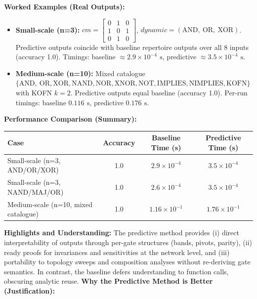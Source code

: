 \textbf{Worked Examples (Real Outputs):}
\begin{itemize}
 \item \textbf{Small-scale (n=3):} \(cm=\begin{bmatrix}0&1&0\\1&0&1\\0&1&0\end{bmatrix}\), \(dynamic=(\mathrm{AND},\ \mathrm{OR},\ \mathrm{XOR})\). Predictive outputs coincide with baseline repertoire outputs over all 8 inputs (accuracy 1.0). Timings: baseline \(\approx 2.9\times 10^{-4}\,\ \mathrm{s}\), predictive \(\approx 3.5\times 10^{-4}\,\ \mathrm{s}\).
 \item \textbf{Medium-scale (n=10):} Mixed catalogue \(\{\mathrm{AND},\ \mathrm{OR}, \mathrm{XOR}, \mathrm{NAND}, \mathrm{NOR}, \mathrm{XNOR}, \mathrm{NOT}, \mathrm{IMPLIES}, \mathrm{NIMPLIES}, \mathrm{KOFN}\}\) with KOFN \(k=2\). Predictive outputs equal baseline (accuracy 1.0). Per-run timings: baseline \(0.116\,\ \mathrm{s}\), predictive \(0.176\,\ \mathrm{s}\).
\end{itemize}
\textbf{Performance Comparison (Summary):}
\begin{center}
\begin{tabular}{lccc}
\toprule
\textbf{Case} & \textbf{Accuracy} & \textbf{Baseline Time (s)} & \textbf{Predictive Time (s)} \\
\midrule
Small-scale (n=3, AND/OR/XOR) & 1.0 & $2.9\times 10^{-4}$ & $3.5\times 10^{-4}$ \\
Small-scale (n=3, NAND/MAJ/OR) & 1.0 & $2.6\times 10^{-4}$ & $3.5\times 10^{-4}$ \\
Medium-scale (n=10, mixed catalogue) & 1.0 & $1.16\times 10^{-1}$ & $1.76\times 10^{-1}$ \\
\bottomrule
\end{tabular}
\end{center}
\textbf{Highlights and Understanding:} The predictive method provides (i) direct interpretability of outputs through per-gate structures (bands, pivots, parity), (ii) ready proofs for invariances and sensitivities at the network level, and (iii) portability to topology sweeps and composition analyses without re-deriving gate semantics. In contrast, the baseline defers understanding to function calls, obscuring analytic reuse.
\textbf{Why the Predictive Method is Better (Justification):}
